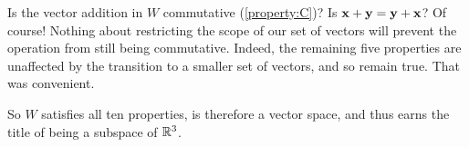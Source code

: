 \documentclass{ximera}
\begin{document}
\begin{example}
\begin{question}
    Is the vector addition in $W$ commutative (\ref{property:C})?  Is
    $\mathbf{x}+\mathbf{y}=\mathbf{y}+\mathbf{x}$?  Of course!  Nothing about
    restricting the scope of our set of vectors will prevent the
    operation from still being commutative.  Indeed, the remaining five
    properties are unaffected by the transition to a smaller set of
    vectors, and so remain true.  That was convenient.
    
    So $W$ satisfies all ten properties, is therefore a vector space,
    and thus earns the title of being a subspace of $\mathbb{R}^{3}$.
  \end{question}
\end{example}
\end{document}
